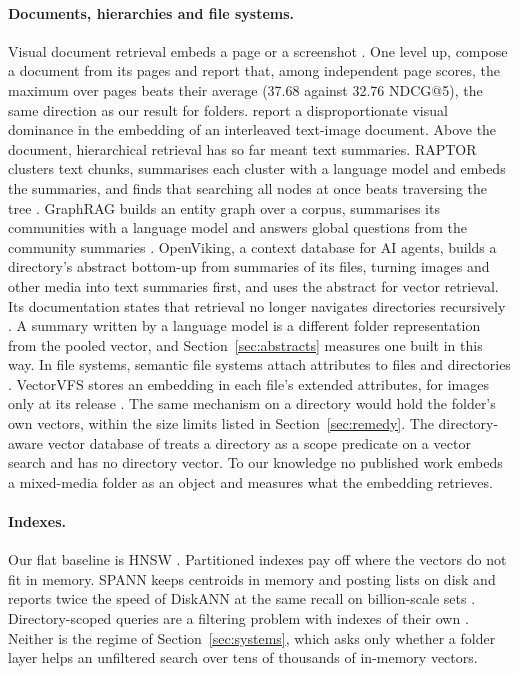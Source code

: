 \documentclass[11pt]{article}
\begin{document}
\paragraph{Documents, hierarchies and file systems.} Visual document retrieval embeds a page or a screenshot \citep{faysse2025colpali,ma2024dse,yu2025visrag}. One level up, \citet{you2026docpc} compose a document from its pages and report that, among independent page scores, the maximum over pages beats their average (37.68 against 32.76 NDCG@5), the same direction as our result for folders. \citet{zhang2025tiir} report a disproportionate visual dominance in the embedding of an interleaved text-image document. Above the document, hierarchical retrieval has so far meant text summaries. RAPTOR clusters text chunks, summarises each cluster with a language model and embeds the summaries, and finds that searching all nodes at once beats traversing the tree \citep{sarthi2024raptor}. GraphRAG builds an entity graph over a corpus, summarises its communities with a language model and answers global questions from the community summaries \citep{edge2024graphrag}. OpenViking, a context database for AI agents, builds a directory's abstract bottom-up from summaries of its files, turning images and other media into text summaries first, and uses the abstract for vector retrieval. Its documentation states that retrieval no longer navigates directories recursively \citep{openviking2026docs}. A summary written by a language model is a different folder representation from the pooled vector, and Section~\ref{sec:abstracts} measures one built in this way. In file systems, semantic file systems attach attributes to files and directories \citep{gifford1991sfs}. VectorVFS stores an embedding in each file's extended attributes, for images only at its release \citep{perone2025vectorvfs}. The same mechanism on a directory would hold the folder's own vectors, within the size limits listed in Section~\ref{sec:remedy}. The directory-aware vector database of \citet{wang2026directoryaware} treats a directory as a scope predicate on a vector search and has no directory vector. To our knowledge no published work embeds a mixed-media folder as an object and measures what the embedding retrieves.

\paragraph{Indexes.} Our flat baseline is HNSW \citep{malkov2020hnsw}. Partitioned indexes pay off where the vectors do not fit in memory. SPANN keeps centroids in memory and posting lists on disk and reports twice the speed of DiskANN at the same recall on billion-scale sets \citep{chen2021spann}. Directory-scoped queries are a filtering problem with indexes of their own \citep{wang2026directoryaware,patel2024acorn}. Neither is the regime of Section~\ref{sec:systems}, which asks only whether a folder layer helps an unfiltered search over tens of thousands of in-memory vectors.
\end{document}

